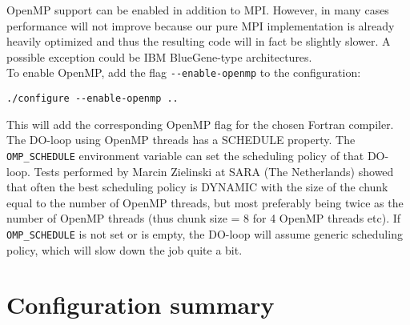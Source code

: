 OpenMP support can be enabled in addition to MPI. However, in many
cases performance will not improve because our pure MPI implementation
is already heavily optimized and thus the resulting code will in fact
be slightly slower. A possible exception could be IBM BlueGene-type
architectures.\\

\noindent
To enable OpenMP,  add the flag \texttt{-{}-enable-openmp} to the configuration:
\begin{verbatim}
./configure --enable-openmp ..
\end{verbatim}
This will add the corresponding OpenMP flag for the chosen Fortran compiler.\\


The DO-loop using OpenMP threads has a SCHEDULE property. The \texttt{OMP\_SCHEDULE}
environment variable can set the scheduling policy of that DO-loop.
Tests performed by Marcin Zielinski at SARA (The Netherlands) showed
that often the best scheduling policy is DYNAMIC with the size of
the chunk equal to the number of OpenMP threads, but most preferably
being twice as the number of OpenMP threads (thus chunk size = 8 for
4 OpenMP threads etc). If \texttt{OMP\_SCHEDULE} is not set or is empty, the
DO-loop will assume generic scheduling policy, which will slow down
the job quite a bit.


\section{Configuration summary}

